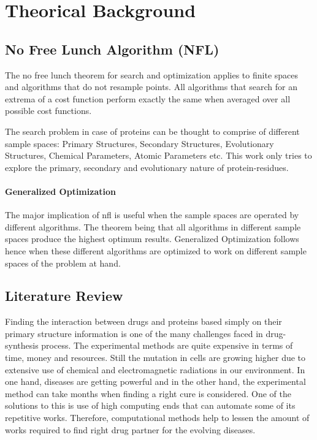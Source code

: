 \chapter{Theorical Background}


\section{No Free Lunch Algorithm (NFL)}
The no free lunch theorem for search and optimization \cite{Wolpert2005} applies to finite spaces and algorithms that do not resample points. All algorithms that search for an extrema of a cost function perform exactly the same when averaged over all possible cost functions.

The search problem in case of proteins can be thought to comprise of different sample spaces: Primary Structures, Secondary Structures, Evolutionary Structures, Chemical Parameters, Atomic Parameters etc. This work only tries to explore the primary, secondary and evolutionary nature of protein-residues.

\subsubsection{Generalized Optimization}
The major implication of \acrshort{nfl} is useful when the sample spaces are operated by different algorithms. The theorem being that all algorithms in different sample spaces produce the highest optimum results. Generalized Optimization follows hence when these different algorithms are optimized to work on different sample spaces of the problem at hand.


\section{Literature Review}

Finding the interaction between drugs and proteins based simply on their primary structure information is one of the many challenges faced in drug-synthesis process. The experimental methods are quite expensive in terms of time, money and resources. Still the mutation in cells are growing higher due to extensive use of chemical and electromagnetic radiations in our environment. In one hand, diseases are getting powerful and in the other hand, the experimental method can take months when finding a right cure is considered. One of the solutions to this is use of high computing ends that can automate some of its repetitive works. Therefore, computational methods help to lessen the amount of works required to find right drug partner for the evolving diseases.

